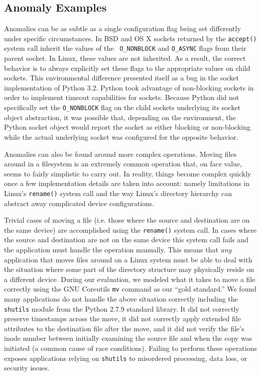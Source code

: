     \subsection{Anomaly Examples}
    \label{subsec:anomalyexamples}
    Anomalies can be as subtle as a single configuration flag being set
    differently under specific circumstances.  In BSD and OS X sockets returned
    by the {\tt accept()} system call inherit the values of the {\tt
      O\_NONBLOCK} and {\tt O\_ASYNC} flags from their parent socket.  In Linux,
    these values are not inherited.  As a result, the correct behavior is to
    always explicitly set these flags to the appropriate values on child
    sockets.  This environmental difference presented itself as a bug
    in the socket implementation of Python 3.2.  Python took advantage of
    non-blocking sockets in order to implement timeout capabilities for sockets.
    Because Python did not specifically set the {\tt O\_NONBLOCK} flag on the
    child sockets underlying its socket object abstraction, it was possible that,
    depending on the environment, the Python socket object would report the
    socket as either blocking or non-blocking while the actual underlying socket
    was configured for the opposite behavior.

    Anomalies can also be found around more complex operations.  Moving files
    around in a filesystem is an extremely common operation that, on face value,
    seems to fairly simplistic to carry out.  In reality, things become complex
    quickly once a few implementation details are taken into account: namely
    limitations in Linux's {\tt rename()} system call and the way Linux's
    directory hierarchy can abstract away complicated device configurations.

    Trivial cases of moving a file (i.e. those where the source and destination
    are on the same device) are accomplished using the {\tt rename()} system
    call.  In cases where the source and destination are not on the same device
    this system call fails and the application must handle the operation
    manually. This means that \emph{any} application that moves files around on
    a Linux system must be able to deal with the situation where some part of
    the directory structure may physically reside on a different device.
    During our evaluation, we modeled what
    it takes to move a file correctly using the GNU Coreutils {\tt mv} command
    as our ``gold standard.''  We found many applications do not handle the
    above situation correctly including the {\tt shutils} module from the Python
    2.7.9 standard library.  It did not correctly preserve timestamps across the
    move, it did not correctly apply extended file attributes to the destination
    file after the move, and it did not verify the file's inode number between
    initially examining the source file and when the copy was initiated (a
    common cause of race conditions).  Failing to perform these operations
    exposes applications relying on {\tt shutils} to misordered processing, data
    loss, or security issues.

